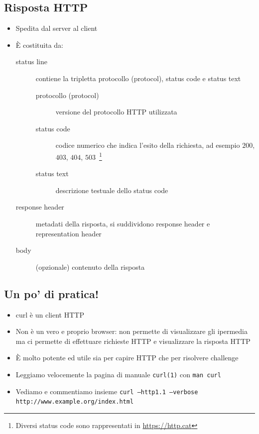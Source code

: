 \documentclass{beamer}
\newcommand{\code}[1]{\mbox{\texttt{#1}}}
\newcommand{\command}[1]{\mbox{\texttt{#1}}}
\begin{document}
\subsection*{Risposta HTTP}
\begin{frame}[allowframebreaks]{\insertsection}{\insertsubsection}
\begin{itemize}
\item Spedita dal \alert{server} al \alert{client}
\item È costituita da:
\begin{description}
\item[status line] contiene la tripletta \alert{protocollo (protocol)},
\alert{status code} e \alert{status text}
\begin{description}
\item[protocollo (protocol)] versione del protocollo HTTP utilizzata
\item[status code] codice numerico che indica l'esito della richiesta, ad
esempio $200$, $403$, $404$, $503$~\footnote{Diversi status code sono
rappresentati in \url{https://http.cat}}
\item[status text] descrizione testuale dello status code
\end{description}
\item[response header] metadati della risposta, si suddividono \alert{response
header} e \alert{representation header}
\item[body] (opzionale) contenuto della risposta
\end{description}
\end{itemize}
\end{frame}

\subsection*{Un po' di pratica!}
\begin{frame}{\insertsection}{\insertsubsection}
\begin{itemize}
\item \alert{curl} è un client \alert{HTTP}
\item Non è un vero e proprio browser: non permette di visualizzare gli
ipermedia ma ci permette di effettuare richieste HTTP e visualizzare la
risposta HTTP
\item È molto potente ed utile sia per capire HTTP che per risolvere challenge
\item Leggiamo velocemente la pagina di manuale \code{curl(1)} con
\command{man curl}
\item Vediamo e commentiamo insieme
\small{\command{curl --http1.1 --verbose http://www.example.org/index.html}}
\end{itemize}
\end{frame}
\end{document}
